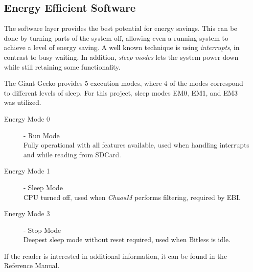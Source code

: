 
\subsection{Energy Efficient Software}

The software layer provides the best potential for energy savings. This can be done by turning parts of the system off, allowing
even a running system to achieve a level of energy saving. A well known technique is using \textit{interrupts}, in contrast
to busy waiting. In addition, {\it sleep modes} lets the system power down while still retaining some functionality.

The Giant Gecko provides 5 execution modes, where 4 of the modes correspond to different levels
of sleep. For this project, sleep modes EM0, EM1, and EM3 was utilized.


\begin{description}
	\item[Energy Mode 0] - Run Mode \hfill \\
		Fully operational with all features available, used when handling
interrupts and while reading from SDCard.
	\item[Energy Mode 1] - Sleep Mode \hfill \\
		CPU turned off, used when \textit{ChaosM} performs filtering, required
by EBI.
	\item[Energy Mode 3] - Stop Mode \hfill \\
		Deepest sleep mode without reset required, used when Bitless is idle.
\end{description}

If the reader is interested in additional information, it
can be found in the Reference Manual\cite{efm32gg}.
